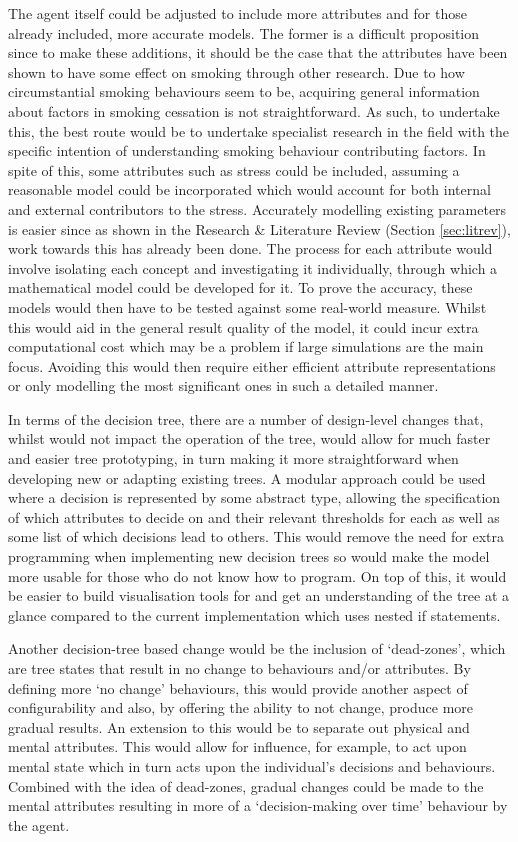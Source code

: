 \documentclass[]{report}
\begin{document}
The agent itself could be adjusted to include more attributes and for those already included, more accurate models. The former is a difficult proposition since to make these additions, it should be the case that the attributes have been shown to have some effect on smoking through other research. Due to how circumstantial smoking behaviours seem to be, acquiring general information about factors in smoking cessation is not straightforward. As such, to undertake this, the best route would be to undertake specialist research in the field with the specific intention of understanding smoking behaviour contributing factors. In spite of this, some attributes such as stress could be included, assuming a reasonable model could be incorporated which would account for both internal and external contributors to the stress. Accurately modelling existing parameters is easier since as shown in the Research \& Literature Review (Section \ref{sec:litrev}), work towards this has already been done. The process for each attribute would involve isolating each concept and investigating it individually, through which a mathematical model could be developed for it. To prove the accuracy, these models would then have to be tested against some real-world measure. Whilst this would aid in the general result quality of the model, it could incur extra computational cost which may be a problem if large simulations are the main focus. Avoiding this would then require either efficient attribute representations or only modelling the most significant ones in such a detailed manner.

In terms of the decision tree, there are a number of design-level changes that, whilst would not impact the operation of the tree, would allow for much faster and easier tree prototyping, in turn making it more straightforward when developing new or adapting existing trees. A modular approach could be used where a decision is represented by some abstract type, allowing the specification of which attributes to decide on and their relevant thresholds for each as well as some list of which decisions lead to others. This would remove the need for extra programming when implementing new decision trees so would make the model more usable for those who do not know how to program. On top of this, it would be easier to build visualisation tools for and get an understanding of the tree at a glance compared to the current implementation which uses nested if statements.

Another decision-tree based change would be the inclusion of `dead-zones', which are tree states that result in no change to behaviours and/or attributes. By defining more `no change' behaviours, this would provide another aspect of configurability and also, by offering the ability to not change, produce more gradual results. An extension to this would be to separate out physical and mental attributes. This would allow for influence, for example, to act upon mental state which in turn acts upon the individual's decisions and behaviours. Combined with the idea of dead-zones, gradual changes could be made to the mental attributes resulting in more of a `decision-making over time' behaviour by the agent.
\end{document}
